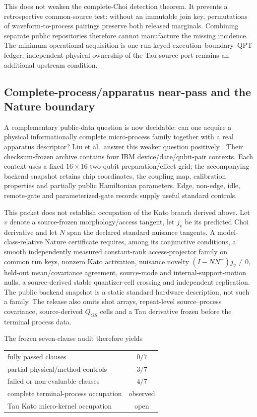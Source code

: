\documentclass[11pt]{article}
\begin{document}
This does not weaken the complete-Choi detection theorem. It prevents a
retrospective common-source test: without an immutable join key, permutations
of waveform-to-process pairings preserve both released marginals. Combining
separate public repositories therefore cannot manufacture the missing
incidence. The minimum operational acquisition is one run-keyed
execution--boundary--QPT ledger; independent physical ownership of the Tau
source port remains an additional upstream condition.

\subsection{Complete-process/apparatus near-pass and the Nature boundary}

A complementary public-data question is now decidable: can one acquire a
physical informationally complete micro-process family together with a real
apparatus descriptor? Liu et al.\ answer this weaker question positively
\citep{LiuRobustLindbladian2026,LiuLindbladianData2026}. Their checksum-frozen
archive contains four IBM device/date/qubit-pair contexts. Each context uses a
fixed $16\times16$ two-qubit preparation/effect grid; the accompanying backend
snapshot retains chip coordinates, the coupling map, calibration properties
and partially public Hamiltonian parameters. Edge, non-edge, idle,
remote-gate and parameterized-gate records supply useful standard controls.

This packet does not establish occupation of the Kato branch derived above.
Let $v$ denote a source-frozen morphology/access tangent, let $j_v$ be its
predicted Choi derivative and let $N$ span the declared standard nuisance
tangents. A model-class-relative Nature certificate requires, among its
conjunctive conditions, a smooth independently measured constant-rank
access-projector family on common run keys, nonzero Kato activation, nuisance
novelty $(I-NN^+)j_v\ne0$, held-out mean/covariance agreement, source-mode and
internal-support-motion nulls, a source-derived stable quantizer-cell crossing
and independent replication. The public backend snapshot is a static standard
hardware description, not such a family. The release also omits shot arrays,
repeat-level source--process covariance, source-derived $Q_{OS}$ cells and a
Tau derivative frozen before the terminal process data.

The frozen seven-clause audit therefore yields

\begin{center}
\begin{tabular}{lc}
\toprule
fully passed clauses & $0/7$ \\
partial physical/method controls & $3/7$ \\
failed or non-evaluable clauses & $4/7$ \\
complete terminal-process occupation & observed \\
Tau Kato micro-kernel occupation & open \\
\bottomrule
\end{tabular}
\end{center}
\end{document}

